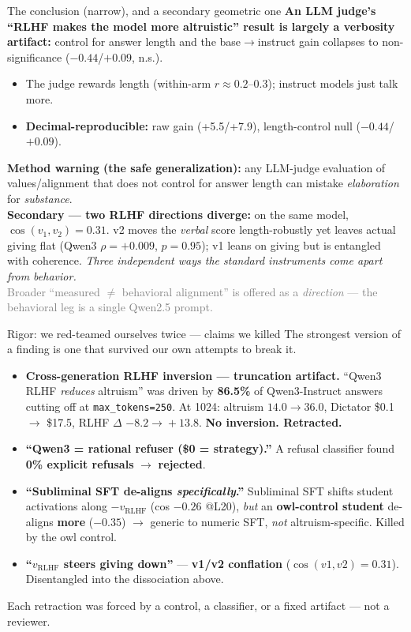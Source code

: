 \documentclass[aspectratio=169,11pt]{beamer}
\begin{document}
\begin{frame}{The conclusion (narrow), and a secondary geometric one}
\textbf{An LLM judge's ``RLHF makes the model more altruistic'' result is largely a verbosity artifact:}
control for answer length and the base$\to$instruct gain collapses to non-significance ($-0.44$/$+0.09$, n.s.).
\begin{itemize}
  \item The judge rewards length (within-arm $r\approx0.2$--$0.3$); instruct models just talk more.
  \item \textbf{Decimal-reproducible:} raw gain (+5.5/+7.9), length-control null ($-0.44$/$+0.09$).
\end{itemize}
\textbf{Method warning (the safe generalization):} any LLM-judge evaluation of values/alignment that does not
control for answer length can mistake \emph{elaboration} for \emph{substance}.\\[4pt]
\textbf{Secondary --- two RLHF directions diverge:} on the same model, $\cos(v_1,v_2)=0.31$. v2 moves the
\emph{verbal} score length-robustly yet leaves actual giving flat (Qwen3 $\rho=+0.009$, $p=0.95$); v1 leans on
giving but is entangled with coherence. \emph{Three independent ways the standard instruments come apart from behavior.}\\[3pt]
\footnotesize\textcolor{gray}{Broader ``measured $\neq$ behavioral alignment'' is offered as a \emph{direction} --- the behavioral leg is a single Qwen2.5 prompt.}
\end{frame}

\begin{frame}{Rigor: we red-teamed ourselves twice --- claims we killed}
  The strongest version of a finding is one that survived our own attempts to break it.
  \begin{itemize}
    \item \textbf{Cross-generation RLHF inversion --- truncation artifact.}
      ``Qwen3 RLHF \emph{reduces} altruism'' was driven by \textbf{86.5\%} of
      Qwen3-Instruct answers cutting off at \texttt{max\_tokens=250}. At 1024:
      altruism $14.0 \!\to\! 36.0$, Dictator \$0.1 $\!\to\!$ \$17.5,
      RLHF $\Delta$ $-8.2 \!\to\! +13.8$. \textbf{No inversion. Retracted.}
    \item \textbf{``Qwen3 = rational refuser (\$0 = strategy).''} A refusal
      classifier found \textbf{0\% explicit refusals} $\to$ \textbf{rejected}.
    \item \textbf{``Subliminal SFT de-aligns \emph{specifically}.''} Subliminal
      SFT shifts student activations along $-v_{\text{RLHF}}$ (cos $-0.26$ @L20),
      \emph{but} an \textbf{owl-control student} de-aligns \textbf{more} ($-0.35$)
      $\to$ generic to numeric SFT, \emph{not} altruism-specific. Killed by the owl control.
    \item \textbf{``$v_{\text{RLHF}}$ steers giving down''} --- \textbf{v1/v2
      conflation} ($\cos(v1,v2){=}0.31$). Disentangled into the dissociation above.
  \end{itemize}
  \footnotesize Each retraction was forced by a control, a classifier, or a fixed artifact --- not a reviewer.
\end{frame}
\end{document}
